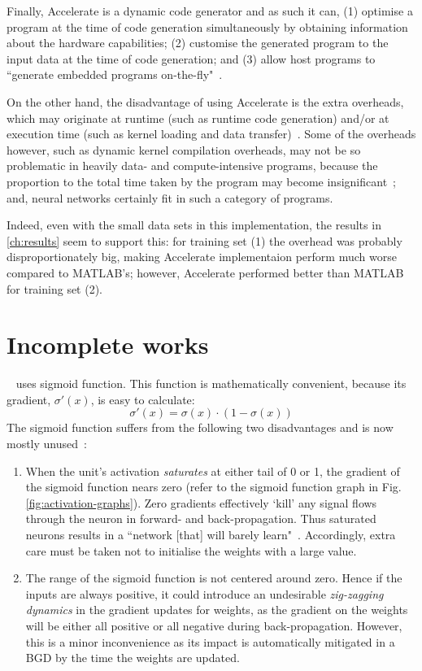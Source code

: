 Finally, Accelerate is a dynamic code generator and as such it can, (1) optimise a program at the time of code generation simultaneously by obtaining information about the hardware capabilities; (2) customise the generated program to the input data at the time of code generation; and (3) allow host programs to ``generate embedded programs on-the-fly"~\cite{ChaKelLee11}.

On the other hand, the disadvantage of using Accelerate is the extra overheads, which may originate at runtime (such as runtime code generation) and/or at execution time (such as kernel loading and data transfer)~\cite{ChaKelLee11}. Some of the overheads however, such as dynamic kernel compilation overheads, may not be so problematic in heavily data- and compute-intensive programs, because the proportion to the total time taken by the program may become insignificant~\cite{ChaKelLee11}; and, neural networks certainly fit in such a category of programs. 

Indeed, even with the small data sets in this implementation, the results in \ref{ch:results} seem to support this: for training set (1) the overhead was probably disproportionately big, making Accelerate implementaion perform much worse compared to MATLAB's; however, Accelerate performed better than MATLAB for training set (2).

\section{Incomplete works} \label{se:eval.incomplete}

~\cite{Eve16} uses sigmoid function. This function is mathematically convenient, because its gradient, $\sigma'(x)$, is easy to calculate:
$$\sigma'(x) = \sigma(x) \cdot (1 - \sigma(x))$$
The sigmoid function suffers from the following two disadvantages and is now mostly unused~\cite{Kar16}:
\begin{enumerate}
\item When the unit's activation \textit{saturates} at either tail of 0 or 1, the gradient of the sigmoid function nears zero (refer to the sigmoid function graph in Fig. \ref{fig:activation-graphs}). Zero gradients effectively `kill' any signal flows through the neuron in forward- and back-propagation. Thus saturated neurons results in a ``network [that] will barely learn"~\cite{Kar16}. Accordingly, extra care must be taken not to initialise the weights with a large value.
\item The range of the sigmoid function is not centered around zero. Hence if the inputs are always positive, it could introduce an undesirable \textit{zig-zagging dynamics} in the gradient updates for weights, as the gradient on the weights will be either all positive or all negative during back-propagation. However, this is a minor inconvenience as its impact is automatically mitigated in a BGD by the time the weights are updated.
\end{enumerate}


